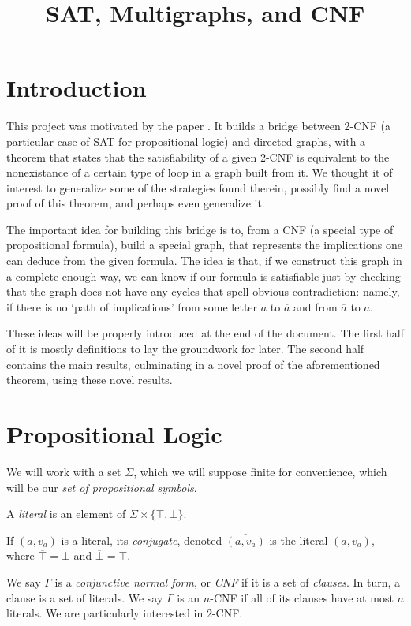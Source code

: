 \documentclass[11pt]{article}
\title{SAT, Multigraphs, and CNF}
\author{}
\date{}
\newcommand{\conj}[1]{\overline{#1}}
\begin{document}
\maketitle

\section{Introduction}

This project was motivated by the paper \cite{2cnf}. It builds a bridge between 2-CNF (a particular case of SAT for propositional logic) and directed graphs, with a theorem that states that the satisfiability of a given 2-CNF is equivalent to the nonexistance of a certain type of loop in a graph built from it. We thought it of interest to generalize some of the strategies found therein, possibly find a novel proof of this theorem, and perhaps even generalize it.

The important idea for building this bridge is to, from a CNF (a special type of propositional formula), build a special graph, that represents the implications one can deduce from the given formula. The idea is that, if we construct this graph in a complete enough way, we can know if our formula is satisfiable just by checking that the graph does not have any cycles that spell obvious contradiction: namely, if there is no `path of implications' from some letter $a$ to $\conj a$ and from $\conj a$ to $a$.

These ideas will be properly introduced at the end of the document. The first half of it is mostly definitions to lay the groundwork for later. The second half contains the main results, culminating in a novel proof of the aforementioned theorem, using these novel results.

\section{Propositional Logic}

We will work with a set $\Sigma$, which we will suppose finite for convenience, which will be our \emph{set of propositional symbols}.

A \emph{literal} is an element of $\Sigma \times \{\top, \bot\}$.

If $(a, v_a)$ is a literal, its \emph{conjugate}, denoted $\conj{(a,v_a)}$ is the literal $(a, \conj{v_a})$, where $\conj \top = \bot$ and $\conj \bot = \top$.

We say $\Gamma$ is a \emph{conjunctive normal form}, or \emph{CNF} if it is a set of \emph{clauses}. In turn, a clause is a set of literals. We say $\Gamma$ is an $n$-CNF if all of its clauses have at most $n$ literals. We are particularly interested in $2$-CNF.
\end{document}

